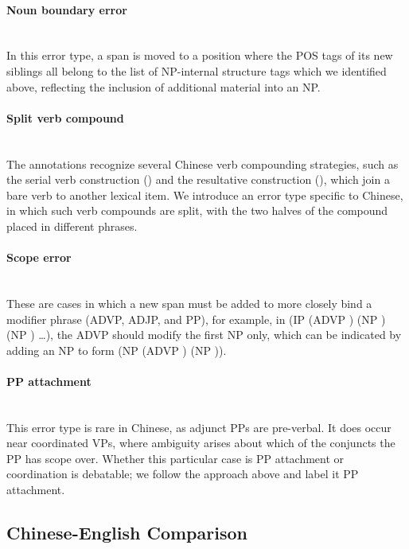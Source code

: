\paragraph{Noun boundary error} \strut \\
In this error type, a span is moved to a
position where the POS tags of its new siblings all belong to the
list of NP-internal structure tags which we identified above, reflecting
the inclusion of additional material into an NP.

\paragraph{Split verb compound} \strut \\
The \pctb annotations recognize several
Chinese verb compounding strategies, such as the serial verb construction
(\mbox{}) and the resultative construction
(\mbox{}), which join a bare verb to another
lexical item.  We introduce an error type specific to Chinese, in which such
verb compounds are split, with the two halves of the compound placed in
different phrases.

\paragraph{Scope error} \strut \\
These are cases in which a new span must be added to more closely bind a modifier phrase (ADVP, ADJP, and PP), for example, in 
(IP (ADVP \mbox{}) (NP \mbox{}) (NP \mbox{}) \ldots), the ADVP should modify the first NP only, which can be indicated by adding an NP to form (NP (ADVP \mbox{}) (NP \mbox{})).

\paragraph{PP attachment} \strut \\
This error type is rare in Chinese, as adjunct PPs are pre-verbal.  It does
occur near coordinated VPs, where ambiguity arises about which of the conjuncts
the PP has scope over.  Whether this particular case is PP attachment or
coordination is debatable; we follow the approach above and
label it PP attachment.

\subsection{Chinese-English Comparison} \label{subsec:chinese_english_comparison}

